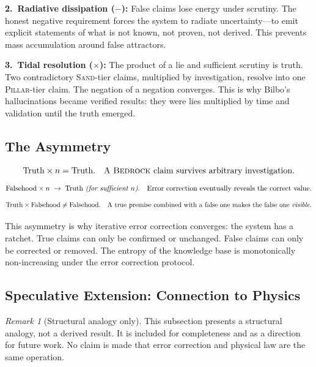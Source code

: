 \documentclass[11pt]{article}
\theoremstyle{definition}
\theoremstyle{remark}
\newtheorem{remark}[theorem]{Remark}
\newcommand{\BEDROCK}{\textsc{Bedrock}}
\newcommand{\PILLAR}{\textsc{Pillar}}
\newcommand{\SAND}{\textsc{Sand}}
\begin{document}
\medskip
\noindent\textbf{2.\ Radiative dissipation ($-$):}  False claims lose energy
under scrutiny.  The honest negative requirement forces the system to radiate
uncertainty---to emit explicit statements of what is not known, not proven, not
derived.  This prevents mass accumulation around false attractors.

\medskip
\noindent\textbf{3.\ Tidal resolution ($\times$):}  The product of a lie and
sufficient scrutiny is truth.  Two contradictory \SAND-tier claims, multiplied
by investigation, resolve into one \PILLAR-tier claim.  The negation of a
negation converges.  This is why Bilbo's hallucinations became verified results:
they were lies multiplied by time and validation until the truth emerged.

\subsection{The Asymmetry}
\label{sec:asymmetry}

\[
  \text{Truth} \times n = \text{Truth.}
  \quad
  \text{A \BEDROCK{} claim survives arbitrary investigation.}
\]
\[
  \text{Falsehood} \times n \;\to\; \text{Truth \emph{(for sufficient~$n$)}.}
  \quad
  \text{Error correction eventually reveals the correct value.}
\]
\[
  \text{Truth} \times \text{Falsehood} \neq \text{Falsehood.}
  \quad
  \text{A true premise combined with a false one makes the false one
  \emph{visible}.}
\]

This asymmetry is why iterative error correction converges: the system has a
ratchet.  True claims can only be confirmed or unchanged.  False claims can only
be corrected or removed.  The entropy of the knowledge base is monotonically
non-increasing under the error correction protocol.

\subsection{Speculative Extension: Connection to Physics}
\label{sec:physics-connection}

\begin{remark}[Structural analogy only]
This subsection presents a structural analogy, not a derived result.  It is
included for completeness and as a direction for future work.  No claim is made
that error correction and physical law are the same operation.
\end{remark}
\end{document}

